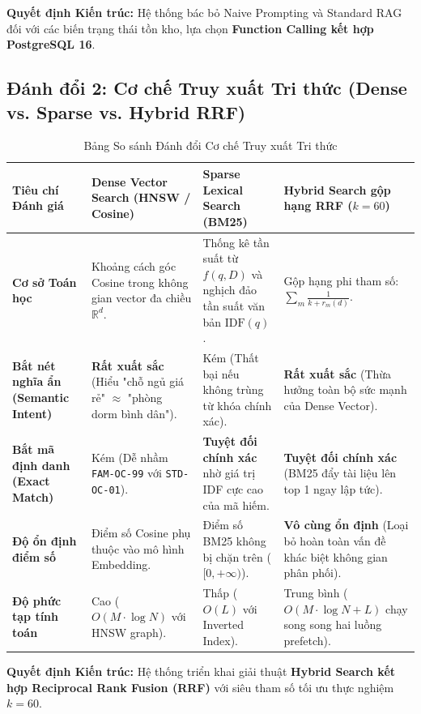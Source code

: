 \textbf{Quyết định Kiến trúc:} Hệ thống bác bỏ Naive Prompting và Standard RAG đối với các biến trạng thái tồn kho, lựa chọn \textbf{Function Calling kết hợp PostgreSQL 16}.

\subsection{Đánh đổi 2: Cơ chế Truy xuất Tri thức (Dense vs. Sparse vs. Hybrid RRF)}
\label{subsec:tradeoff_retrieval}

\begin{table}[h!]
\centering
\small
\begin{tabular}{|p{3.2cm}|p{3.8cm}|p{3.8cm}|p{4.2cm}|}
\hline
\textbf{Tiêu chí Đánh giá} & \textbf{Dense Vector Search (HNSW / Cosine)} & \textbf{Sparse Lexical Search (BM25)} & \textbf{Hybrid Search gộp hạng RRF ($k=60$)} \\
\hline
\textbf{Cơ sở Toán học} & Khoảng cách góc Cosine trong không gian vector đa chiều $\mathbb{R}^d$. & Thống kê tần suất từ $f(q, D)$ và nghịch đảo tần suất văn bản $\text{IDF}(q)$. & Gộp hạng phi tham số: $\sum_{m} \frac{1}{k + r_m(d)}$. \\
\hline
\textbf{Bắt nét nghĩa ẩn (Semantic Intent)} & \textbf{Rất xuất sắc} (Hiểu "chỗ ngủ giá rẻ" $\approx$ "phòng dorm bình dân"). & Kém (Thất bại nếu không trùng từ khóa chính xác). & \textbf{Rất xuất sắc} (Thừa hưởng toàn bộ sức mạnh của Dense Vector). \\
\hline
\textbf{Bắt mã định danh (Exact Match)} & Kém (Dễ nhầm \texttt{FAM-OC-99} với \texttt{STD-OC-01}). & \textbf{Tuyệt đối chính xác} nhờ giá trị IDF cực cao của mã hiếm. & \textbf{Tuyệt đối chính xác} (BM25 đẩy tài liệu lên top 1 ngay lập tức). \\
\hline
\textbf{Độ ổn định điểm số} & Điểm số Cosine phụ thuộc vào mô hình Embedding. & Điểm số BM25 không bị chặn trên ($[0, +\infty)$). & \textbf{Vô cùng ổn định} (Loại bỏ hoàn toàn vấn đề khác biệt không gian phân phối). \\
\hline
\textbf{Độ phức tạp tính toán} & Cao ($O(M \cdot \log N)$ với HNSW graph). & Thấp ($O(L)$ với Inverted Index). & Trung bình ($O(M \cdot \log N + L)$ chạy song song hai luồng prefetch). \\
\hline
\end{tabular}
\caption{Bảng So sánh Đánh đổi Cơ chế Truy xuất Tri thức}
\label{tab:tradeoff_retrieval}
\end{table}

\textbf{Quyết định Kiến trúc:} Hệ thống triển khai giải thuật \textbf{Hybrid Search kết hợp Reciprocal Rank Fusion (RRF)} với siêu tham số tối ưu thực nghiệm $k=60$.

